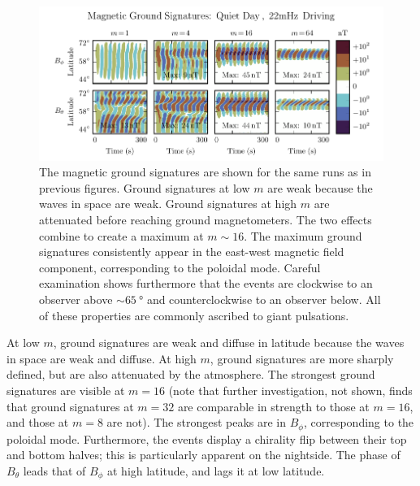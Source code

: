 \documentclass[draft,linenumbers]{agujournal}
\begin{document}
\begin{figure}
    \begin{center}
    \includegraphics[width=\textwidth]{figures/fig_ground_day.pdf}
    \caption{
        The magnetic ground signatures are shown for the same runs as in previous figures. Ground signatures at low $m$ are weak because the waves in space are weak. Ground signatures at high $m$ are attenuated before reaching ground magnetometers. The two effects combine to create a maximum at $m \sim 16$. The maximum ground signatures consistently appear in the east-west magnetic field component, corresponding to the poloidal mode. Careful examination shows furthermore that the events are clockwise to an observer above $\sim\SI{65}{\degree}$ and counterclockwise to an observer below. All of these properties are commonly ascribed to giant pulsations.
    }
    \label{fig_ground_day}
    \end{center}
\end{figure}

At low $m$, ground signatures are weak and diffuse in latitude because the waves in space are weak and diffuse. At high $m$, ground signatures are more sharply defined, but are also attenuated by the atmosphere. The strongest ground signatures are visible at $m = 16$ (note that further investigation, not shown, finds that ground signatures at $m = 32$ are comparable in strength to those at $m = 16$, and those at $m = 8$ are not). The strongest peaks are in $B_\phi$, corresponding to the poloidal mode. Furthermore, the events display a chirality flip between their top and bottom halves; this is particularly apparent on the nightside. The phase of $B_\theta$ leads that of $B_\phi$ at high latitude, and lags it at low latitude.
\end{document}
